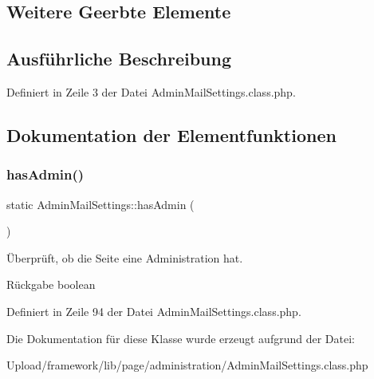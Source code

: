 \subsection*{Weitere Geerbte Elemente}


\subsection{Ausführliche Beschreibung}


Definiert in Zeile 3 der Datei Admin\+Mail\+Settings.\+class.\+php.



\subsection{Dokumentation der Elementfunktionen}
\mbox{\label{class_admin_mail_settings_a32815d3eac3e460e41db19e60fbc0bca}} 
\subsubsection{\texorpdfstring{has\+Admin()}{hasAdmin()}}
{\footnotesize\ttfamily static Admin\+Mail\+Settings\+::has\+Admin (\begin{DoxyParamCaption}{ }\end{DoxyParamCaption})\hspace{0.3cm}{\ttfamily [static]}}

Überprüft, ob die Seite eine Administration hat. \begin{DoxyReturn}{Rückgabe}
boolean 
\end{DoxyReturn}


Definiert in Zeile 94 der Datei Admin\+Mail\+Settings.\+class.\+php.



Die Dokumentation für diese Klasse wurde erzeugt aufgrund der Datei\+:\begin{DoxyCompactItemize}
\item 
Upload/framework/lib/page/administration/Admin\+Mail\+Settings.\+class.\+php\end{DoxyCompactItemize}
